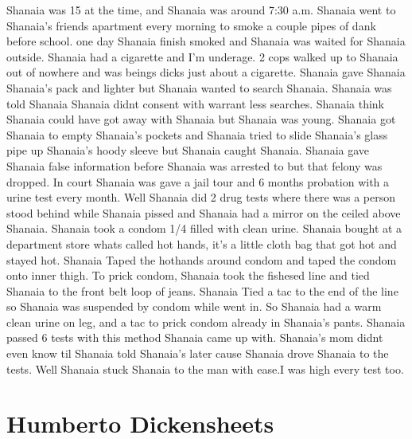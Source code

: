 \documentclass[12pt]{book}
\begin{document}
Shanaia was 15 at the time, and Shanaia was around 7:30 a.m. Shanaia went to Shanaia's friends apartment every morning to smoke a couple pipes of dank before school. one day Shanaia finish smoked and Shanaia was waited for Shanaia outside. Shanaia had a cigarette and I'm underage. 2 cops walked up to Shanaia out of nowhere and was beings dicks just about a cigarette. Shanaia gave Shanaia Shanaia's pack and lighter but Shanaia wanted to search Shanaia. Shanaia was told Shanaia Shanaia didnt consent with warrant less searches. Shanaia think Shanaia could have got away with Shanaia but Shanaia was young. Shanaia got Shanaia to empty Shanaia's pockets and Shanaia tried to slide Shanaia's glass pipe up Shanaia's hoody sleeve but Shanaia caught Shanaia. Shanaia gave Shanaia false information before Shanaia was arrested to but that felony was dropped. In court Shanaia was gave a jail tour and 6 months probation with a urine test every month. Well Shanaia did 2 drug tests where there was a person stood behind while Shanaia pissed and Shanaia had a mirror on the ceiled above Shanaia. Shanaia took a condom 1/4 filled with clean urine. Shanaia bought at a department store whats called hot hands, it's a little cloth bag that got hot and stayed hot. Shanaia Taped the hothands around condom and taped the condom onto inner thigh. To prick condom, Shanaia took the fishesed line and tied Shanaia to the front belt loop of jeans. Shanaia Tied a tac to the end of the line so Shanaia was suspended by condom while went in. So Shanaia had a warm clean urine on leg, and a tac to prick condom already in Shanaia's pants. Shanaia passed 6 tests with this method Shanaia came up with. Shanaia's mom didnt even know til Shanaia told Shanaia's later cause Shanaia drove Shanaia to the tests. Well Shanaia stuck Shanaia to the man with ease.I was high every test too.



\chapter{Humberto Dickensheets}
\end{document}
